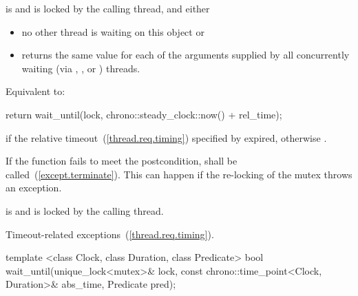 \begin{itemdescr}
\pnum
\precondition {} is  and 
is locked by the calling thread, and either
\begin{itemize}
\item no other thread is waiting on this  object or
\item {} returns the same value for each of the  arguments
supplied by all concurrently waiting (via , , or
) threads.
\end{itemize}

\pnum
\effects Equivalent to:

\begin{codeblock}
return wait_until(lock, chrono::steady_clock::now() + rel_time);
\end{codeblock}

\pnum
\returns {} if
the relative timeout~(\ref{thread.req.timing}) specified by  expired,
otherwise .

\pnum
\notes
If the function fails to meet the postcondition, 
shall be called~(\ref{except.terminate}).
\enternote This can happen if the re-locking of the mutex throws an exception. \exitnote

\pnum
\postcondition {} is  and 
is locked by the calling thread.

\pnum
\throws Timeout-related
exceptions~(\ref{thread.req.timing}).

\end{itemdescr}

%
%
\begin{itemdecl}
template <class Clock, class Duration, class Predicate>
  bool wait_until(unique_lock<mutex>& lock,
                  const chrono::time_point<Clock, Duration>& abs_time,
                  Predicate pred);
\end{itemdecl}

